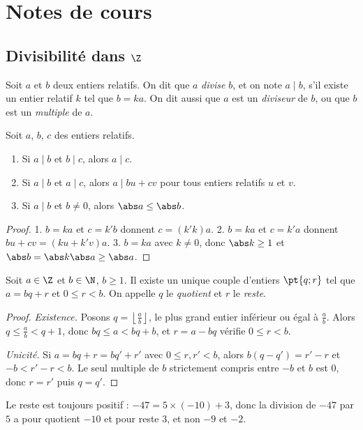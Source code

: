 \mxnewpage
\section{Notes de cours}
\subsection{Divisibilité dans $\Z$}
\begin{definition}
Soit $a$ et $b$ deux entiers relatifs. On dit que $a$ \emph{divise} $b$, et on note $a\mid b$, s'il existe un entier relatif $k$ tel que $b=ka$. On dit aussi que $a$ est un \emph{diviseur} de $b$, ou que $b$ est un \emph{multiple} de $a$.
\end{definition}
\begin{theorem}
Soit $a$, $b$, $c$ des entiers relatifs.
\begin{enumerate}
\item Si $a\mid b$ et $b\mid c$, alors $a\mid c$.
\item Si $a\mid b$ et $a\mid c$, alors $a\mid bu+cv$ pour tous entiers relatifs $u$ et $v$.
\item Si $a\mid b$ et $b\neq0$, alors $\abs a\le\abs b$.
\end{enumerate}
\end{theorem}
\begin{proof}
1. $b=ka$ et $c=k'b$ donnent $c=(k'k)a$. 2. $b=ka$ et $c=k'a$ donnent $bu+cv=(ku+k'v)a$. 3. $b=ka$ avec $k\neq0$, donc $\abs k\ge1$ et $\abs b=\abs k\abs a\ge\abs a$.
\end{proof}
\begin{theorem}
Soit $a\in\Z$ et $b\in\N$, $b\ge1$. Il existe un unique couple d'entiers $\pt{q;r}$ tel que $a=bq+r$ et $0\le r<b$. On appelle $q$ le \emph{quotient} et $r$ le \emph{reste}.
\end{theorem}
\begin{proof}
\emph{Existence.} Posons $q=\left\lfloor\frac ab\right\rfloor$, le plus grand entier inférieur ou égal à $\frac ab$. Alors $q\le\frac ab<q+1$, donc $bq\le a<bq+b$, et $r=a-bq$ vérifie $0\le r<b$.\par
\emph{Unicité.} Si $a=bq+r=bq'+r'$ avec $0\le r,r'<b$, alors $b(q-q')=r'-r$ et $-b<r'-r<b$. Le seul multiple de $b$ strictement compris entre $-b$ et $b$ est $0$, donc $r=r'$ puis $q=q'$.
\end{proof}
\begin{pitfall}
Le reste est toujours positif : $-47=5\times(-10)+3$, donc la division de $-47$ par $5$ a pour quotient $-10$ et pour reste $3$, et non $-9$ et $-2$.
\end{pitfall}

